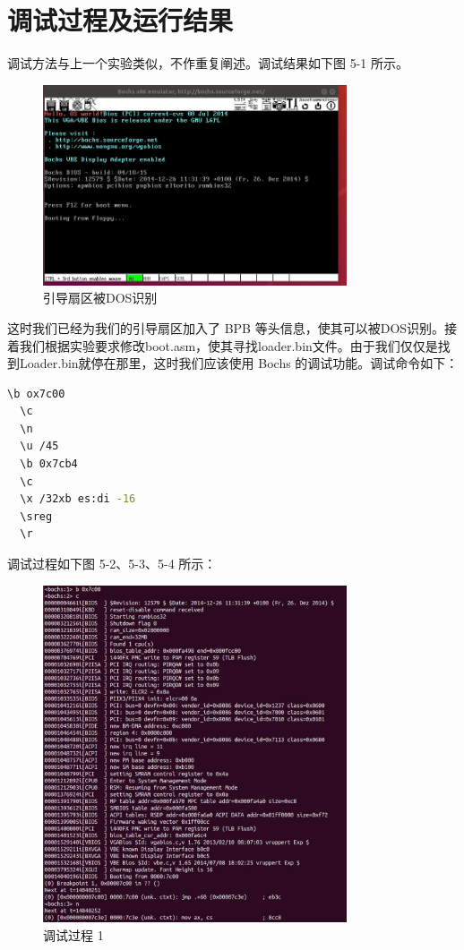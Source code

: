 \section{调试过程及运行结果}

调试方法与上一个实验类似，不作重复阐述。调试结果如下图 5-1 所示。
\begin{figure}[H]
  \centering
  \includegraphics[width=0.8\textwidth]{figures/chapter5/5-1.jpg}
  \caption{引导扇区被DOS识别}
  \label{fig:1}
\end{figure}

这时我们已经为我们的引导扇区加入了 BPB 等头信息，使其可以被DOS识别。接着我们根据实验要求修改boot.asm，使其寻找loader.bin文件。由于我们仅仅是找到Loader.bin就停在那里，这时我们应该使用 Bochs 的调试功能。调试命令如下：
\begin{lstlisting}[language = bash]
  \b ox7c00
  \c
  \n
  \u /45
  \b 0x7cb4
  \c
  \x /32xb es:di -16
  \sreg
  \r
\end{lstlisting}
调试过程如下图 5-2、5-3、5-4 所示：

\begin{figure}[H]
  \centering
  \includegraphics[width=0.8\textwidth]{figures/chapter5/5-2.jpg}
  \caption{调试过程 1}
  \label{fig:2}
\end{figure}

